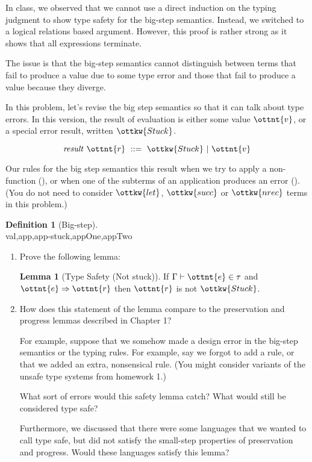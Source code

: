 \documentclass{article}
\theoremstyle{definition}
\newtheorem{definition}{Definition}[section]
\newtheorem{lemma}{Lemma}[section]
\begin{document}
In class, we observed that we cannot use a direct induction on the typing
judgment to show type safety for the big-step semantics. Instead, we 
switched to a logical relations based argument. However, this proof 
is rather strong as it shows that all expressions terminate.

The issue is that the big-step semantics 
cannot distinguish between terms that fail to produce a value
 due to some type error and those that fail to produce a value because they 
diverge. 

In this problem, let's revise the big step semantics so that it can talk about
type errors. In this version, the result of evaluation is either some value
$\ottnt{v}$, or a special error result, written $\ottkw{Stuck}$.

\[ \mathit{result}\ \ottnt{r}\ ::=\ \ottkw{Stuck}\ |\ \ottnt{v} \]

Our rules for the big step semantics this result when we try to apply a
non-function (), or when one of the subterms of an
application produces an error (). (You do not need to
consider $\ottkw{let}$, $\ottkw{succ}$ or $\ottkw{nrec}$ terms in this
problem.)

\begin{definition}[Big-step]\ \\
{val,app,app-stuck,appOne,appTwo}
\end{definition}

\begin{enumerate}
\item Prove the following lemma:
\begin{lemma}[Type Safety (Not stuck)]
If $ \Gamma  \vdash  \ottnt{e}  \in  \tau $ and $ \ottnt{e}  \Rightarrow  \ottnt{r} $ then $\ottnt{r}$ is not $\ottkw{Stuck}$.
\end{lemma}
\item How does this statement of the lemma compare to the preservation and progress lemmas 
described in Chapter 1?

For example, suppose that we somehow made a design error in the
big-step semantics or the typing rules. For example, say we forgot to 
add a rule, or that we added an extra, nonsensical rule. (You might consider 
variants of the unsafe type systems from homework 1.)

What sort of errors would this safety lemma catch? What would still be considered type safe?

Furthermore, we discussed that there were some languages that we wanted to
call type safe, but did not satisfy the small-step properties of preservation
and progress. Would these languages satisfy this lemma?
\end{enumerate}
\end{document}
